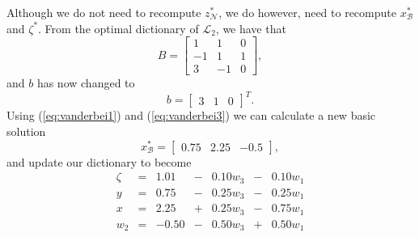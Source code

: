 

Although we do not need to recompute $z_{\mathcal{N}}^*$, we do however,
need to recompute $x_{\mathcal{B}}^*$ and $\zeta^*$.
From the optimal dictionary of $\mathcal{L}_2$, we have that
\[
B = 
\left[
\begin{array}{rrr}
     1 &  1 & 0 \\
    -1 &  1 & 1 \\
     3 & -1 & 0
\end{array}
\right],
\]
and $b$ has now changed to
\[
b = \left[
\begin{array}{rrr}
    3 & 1 & 0
\end{array}
\right]^T.
\]
Using (\ref{eq:vanderbei1}) and (\ref{eq:vanderbei3}) we can calculate a new
basic solution
\[
x_{\mathcal{B}}^* =
\left[
\begin{array}{ccc}
    0.75 & 2.25 & -0.5
\end{array}
\right],
\]
and update our dictionary to become
\[
    \begin{array}{rcrcrcr}
        \zeta &=& 1.01 &-& 0.10 w_3 &-& 0.10 w_1 \\ \hline
            y &=& 0.75 &-& 0.25 w_3 &-& 0.25 w_1 \\
            x &=& 2.25 &+& 0.25 w_3 &-& 0.75 w_1 \\
          w_2 &=&-0.50 &-& 0.50 w_3 &+& 0.50 w_1
    \end{array}
\]

